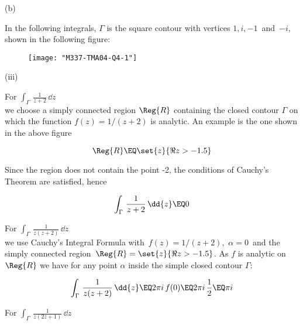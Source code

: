 \documentclass[english,a4paper,11pt]{scrartcl}
\begin{document}
\setcounter{equation}{0}

\bigskip


\begin{labeling}{(b) }
  \item [(a)] In the following integrals, $\Gamma$ is the square contour with vertices $1, i, -1$ \,and\,  $-i$, shown in the following figure:  \\

\bigskip
\begin{figure}[H]
	\centering
	\texttt{[image: "M337-TMA04-Q4-1"]}
\end{figure}


\newpage
\begin{labeling}{(iii) }
\item [(i)] For \quad \( \displaystyle \int_{\Gamma} \, \frac1{z+2} \, \dd{z}  \) \\

\bigskip
we choose a simply connected region $\Reg{R}$ containing the closed contour $\Gamma$ on which the function $f(z) = 1/(z+2)$ is analytic. An example is the one shown in the above figure

\[ \Reg{R} \EQ \set{z}{\Re z > -1.5} \]

Since the region does not contain the point -2, the conditions of Cauchy's Theorem are satisfied, hence  \\

\bigskip
\begin{Answer}
\[ \int_{\Gamma} \, \frac1{z+2} \, \dd{z} \EQ 0 \]
\end{Answer}

\bigskip
\item [(ii)] For \quad \( \displaystyle \int_{\Gamma} \, \frac1{z(z+2)} \, \dd{z} \) \\

\bigskip
we use Cauchy's Integral Formula with \,$f(z) = 1/(z+2)$, \,$\alpha = 0$ \,and the simply connected region \,$\Reg{R} = \set{z}{\Re z > -1.5}$. As $f$ is analytic on $\Reg{R}$ we have for any point $\alpha$ inside the simple closed contour $\Gamma$:\\

\bigskip
\begin{Answer}
\[ \int_{\Gamma} \, \frac1{z(z+2)} \, \dd{z} \EQ 2\pi i \, f(0) \EQ  2\pi i \, \frac1{2} \EQ \pi i \]
\end{Answer}


\newpage
\item [(iii)] For \quad \( \displaystyle \int_{\Gamma} \, \frac1{z(2z+1)} \, \dd{z} \)\\


\end{labeling}
\end{labeling}
\end{document}
